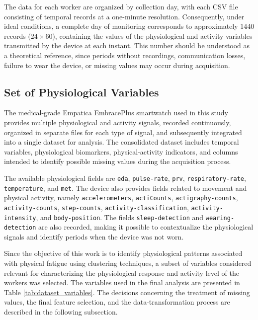 \documentclass[a4paper,fleqn]{cas-sc}
\begin{document}
The data for each worker are organized by collection day, with each CSV file consisting of temporal records at a one-minute resolution. Consequently, under ideal conditions, a complete day of monitoring corresponds to approximately 1440 records ($24 \times 60$), containing the values of the physiological and activity variables transmitted by the device at each instant. This number should be understood as a theoretical reference, since periods without recordings, communication losses, failure to wear the device, or missing values may occur during acquisition.

\subsection{Set of Physiological Variables}

The medical-grade Empatica EmbracePlus smartwatch used in this study provides multiple physiological and activity signals, recorded continuously, organized in separate files for each type of signal, and subsequently integrated into a single dataset for analysis. The consolidated dataset includes temporal variables, physiological biomarkers, physical-activity indicators, and columns intended to identify possible missing values during the acquisition process.

The available physiological fields are \texttt{eda}, \texttt{pulse-rate}, \texttt{prv}, \texttt{respiratory-rate}, \texttt{temperature}, and \texttt{met}. The device also provides fields related to movement and physical activity, namely \texttt{accelerometers}, \texttt{actiCounts}, \texttt{actigraphy-counts}, \texttt{activity-counts}, \texttt{step-counts}, \texttt{activity-classification}, \texttt{activity-intensity}, and \texttt{body-position}. The fields \texttt{sleep-detection} and \texttt{wearing-detection} are also recorded, making it possible to contextualize the physiological signals and identify periods when the device was not worn.

Since the objective of this work is to identify physiological patterns associated with physical fatigue using clustering techniques, a subset of variables considered relevant for characterizing the physiological response and activity level of the workers was selected. The variables used in the final analysis are presented in Table \ref{tab:dataset_variables}. The decisions concerning the treatment of missing values, the final feature selection, and the data-transformation process are described in the following subsection.
\end{document}
